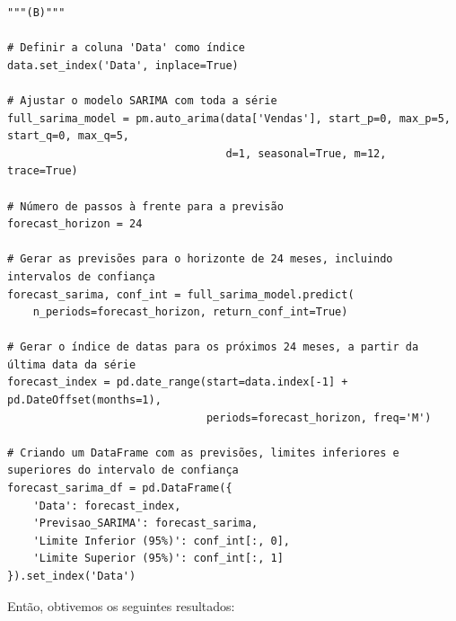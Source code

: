 \documentclass[a4paper, 12pt]{article}
\begin{document}
\begin{lstlisting}[style=python]
"""(B)"""

# Definir a coluna 'Data' como índice
data.set_index('Data', inplace=True)

# Ajustar o modelo SARIMA com toda a série
full_sarima_model = pm.auto_arima(data['Vendas'], start_p=0, max_p=5, start_q=0, max_q=5,
                                  d=1, seasonal=True, m=12, trace=True)

# Número de passos à frente para a previsão
forecast_horizon = 24

# Gerar as previsões para o horizonte de 24 meses, incluindo intervalos de confiança
forecast_sarima, conf_int = full_sarima_model.predict(
    n_periods=forecast_horizon, return_conf_int=True)

# Gerar o índice de datas para os próximos 24 meses, a partir da última data da série
forecast_index = pd.date_range(start=data.index[-1] + pd.DateOffset(months=1),
                               periods=forecast_horizon, freq='M')

# Criando um DataFrame com as previsões, limites inferiores e superiores do intervalo de confiança
forecast_sarima_df = pd.DataFrame({
    'Data': forecast_index,
    'Previsao_SARIMA': forecast_sarima,
    'Limite Inferior (95%)': conf_int[:, 0],
    'Limite Superior (95%)': conf_int[:, 1]
}).set_index('Data')

\end{lstlisting}

Então, obtivemos os seguintes resultados:\\
\end{document}
